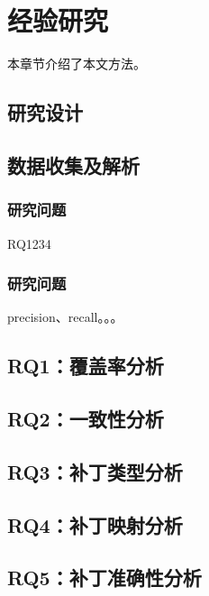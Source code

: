 \chapter{经验研究}

本章节介绍了本文方法。

\section{研究设计}

\section{数据收集及解析}
\subsection{研究问题}
RQ1234
\subsection{研究问题}
precision、recall。。。

\section{RQ1：覆盖率分析}

\section{RQ2：一致性分析}

\section{RQ3：补丁类型分析}

\section{RQ4：补丁映射分析}

\section{RQ5：补丁准确性分析}
